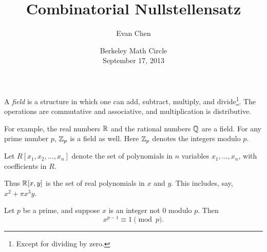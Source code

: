 \documentclass[11pt]{scrartcl}
\begin{document}
\title{Combinatorial Nullstellensatz}
\author{Evan Chen}
\date{Berkeley Math Circle \\ September 17, 2013}
\maketitle

\begin{definition*}
  A \emph{field} is a structure in which one can add, subtract, multiply, and divide\footnote{Except for dividing by zero.}.  The operations are commutative and associative, and multiplication is distributive.
\end{definition*}
For example, the real numbers $\mathbb R$ and the rational numbers $\mathbb Q$ are a field.  For any prime number $p$, $\mathbb Z_p$ is a field as well.  Here $\mathbb Z_p$ denotes the integers modulo $p$.
\begin{definition*}
  Let $R[x_1, x_2, \dots, x_n]$ denote the set of polynomials in $n$ variables $x_1, \dots, x_n$, with coefficients in $R$.
\end{definition*}
Thus $\mathbb R[x,y]$ is the set of real polynomials in $x$ and $y$.  This includes, say, $x^2+\pi x^3y$.

\begin{fact*}
  Let $p$ be a prime, and suppose $x$ is an integer not $0$ modulo $p$.  Then \[ x^{p-1} \equiv 1 \pmod{p}. \]
\end{fact*}
\end{document}
